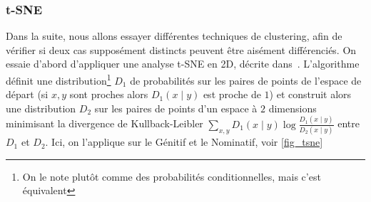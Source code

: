 \documentclass{cours}
\begin{document}
\subsubsection{t-SNE}\label{subsub:tsne}
Dans la suite, nous allons essayer différentes techniques de clustering, afin de vérifier si deux cas supposément distincts peuvent être aisément différenciés.
On essaie d'abord d'appliquer une analyse t-SNE en 2D, décrite dans~\cite{tSNE}.
L'algorithme définit une distribution\footnote{On le note plutôt comme des probabilités conditionnelles, mais c'est équivalent} $D_{1}$ de probabilités sur les paires de points de l'espace de départ (si $x, y$ sont proches alors $D_{1}(x \mid y)$ est proche de $1$) et construit alors une distribution $D_{2}$ sur les paires de points d'un espace à $2$ dimensions minimisant la divergence de Kullback-Leibler $\sum_{x, y}D_{1}(x \mid y)\log\frac{D_{1}(x\mid y)}{D_{2}(x\mid y)}$ entre $D_{1}$ et $D_{2}$.
Ici, on l'applique sur le Génitif et le Nominatif, voir \ref{fig_tsne}
\end{document}
